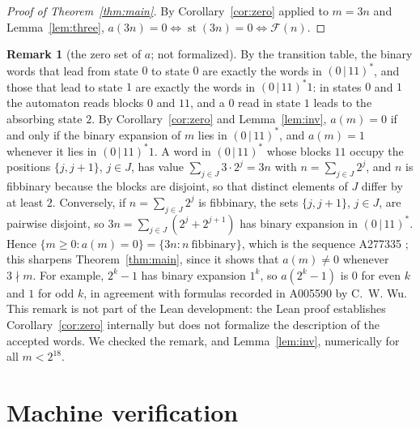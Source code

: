 \documentclass[11pt]{amsart}
\theoremstyle{plain}
\theoremstyle{definition}
\newtheorem{remark}[theorem]{Remark}
\newcommand{\st}{\operatorname{st}}
\newcommand{\Fib}{\mathcal{F}}
\begin{document}
\begin{proof}[Proof of Theorem~\ref{thm:main}]
By Corollary~\ref{cor:zero} applied to $m=3n$ and Lemma~\ref{lem:three}, $a(3n)=0\iff\st(3n)=0\iff\Fib(n)$.
\end{proof}

\begin{remark}[the zero set of $a$; not formalized]\label{rem:zeroset}
By the transition table, the binary words that lead from state $0$ to state $0$ are exactly the words in $(0\,|\,11)^*$, and those that lead to state $1$ are exactly the words in $(0\,|\,11)^*1$: in states $0$ and $1$ the automaton reads blocks $0$ and $11$, and a $0$ read in state $1$ leads to the absorbing state $2$. By Corollary~\ref{cor:zero} and Lemma~\ref{lem:inv}, $a(m)=0$ if and only if the binary expansion of $m$ lies in $(0\,|\,11)^*$, and $a(m)=1$ whenever it lies in $(0\,|\,11)^*1$.
A word in $(0\,|\,11)^*$ whose blocks $11$ occupy the positions $\{j,j+1\}$, $j\in J$, has value $\sum_{j\in J}3\cdot2^j=3n$ with $n=\sum_{j\in J}2^j$, and $n$ is fibbinary because the blocks are disjoint, so that distinct elements of $J$ differ by at least $2$. Conversely, if $n=\sum_{j\in J}2^j$ is fibbinary, the sets $\{j,j+1\}$, $j\in J$, are pairwise disjoint, so $3n=\sum_{j\in J}(2^j+2^{j+1})$ has binary expansion in $(0\,|\,11)^*$. Hence $\{m\ge0: a(m)=0\}=\{3n: n\ \text{fibbinary}\}$, which is the sequence A277335 \cite{A277335}; this sharpens Theorem~\ref{thm:main}, since it shows that $a(m)\ne0$ whenever $3\nmid m$.
For example, $2^k-1$ has binary expansion $1^k$, so $a(2^k-1)$ is $0$ for even $k$ and $1$ for odd $k$, in agreement with formulas recorded in A005590 by C.~W. Wu.
This remark is not part of the Lean development: the Lean proof establishes Corollary~\ref{cor:zero} internally but does not formalize the description of the accepted words. We checked the remark, and Lemma~\ref{lem:inv}, numerically for all $m<2^{18}$.
\end{remark}

\section{Machine verification}\label{sec:lean}
\end{document}
